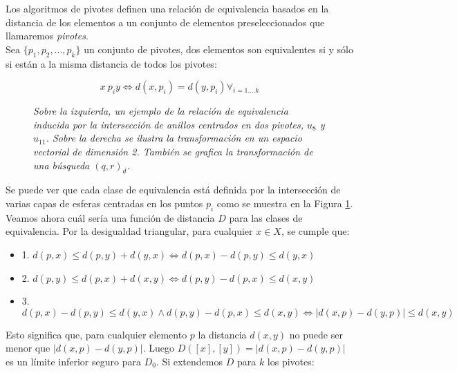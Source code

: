 Los algoritmos de pivotes definen una relaci\'on de equivalencia basados en la distancia de los elementos a un conjunto de elementos preseleccionados que llamaremos \textit{pivotes}.\\

Sea $\{p_1, p_2,...,p_k\}$ un conjunto de pivotes, dos elementos son equivalentes si y s\'olo si est\'an a la misma distancia de todos los pivotes:

\[
x ~ p_i  y \Leftrightarrow d(x,p_i) = d(y,p_i) \forall_{i = 1....k}
\]

\begin{figure}[htb]
\centerline{ %
   \vspace{.2in}
   }
   \caption [Relaci\'on de equivalencia inducida por dos pivotes y su
   correspondiente transformaci\'on en un espacio vectorial]
     {\textsl{\footnotesize{Sobre la izquierda, un ejemplo de la relaci\'on de equivalencia inducida
        por la intersecci\'on de anillos centrados en dos pivotes, $u_8$ y $u_{11}$.
        Sobre la derecha se ilustra la transformaci\'on en un espacio vectorial de dimensi\'on 2.
    	Tambi\'en se grafica la transformaci\'on de una b\'usqueda $(q,r)_d$. }}}
\label{piv1}
\end{figure} 

Se puede ver que cada clase de equivalencia est\'a definida por la intersecci\'on de varias capas de esferas centradas en los puntos $p_i$ como se muestra en la Figura \ref{piv1}.\\

Veamos ahora cu\'al ser\'ia una funci\'on de distancia $D$ para las clases de equivalencia.  Por la desigualdad triangular, para cualquier $x \in X$, se cumple que:

\begin{itemize}
\item 1. $d(p,x) \leq d(p,y) + d(y,x) \Leftrightarrow d(p,x) - d(p,y) \leq d(y,x)$
\item 2. $d(p,y) \leq d(p,x) + d(x,y) \Leftrightarrow d(p,y) - d(p,x) \leq d(x,y)$
\item 3. $d(p,x) - d(p,y) \leq d(y,x) \wedge d(p,y) - d(p,x) \leq d(x,y) \Leftrightarrow |d(x,p) - d(y,p)| \leq d(x,y)$
\end{itemize}

Esto significa que, para cualquier elemento $p$ la distancia $d(x,y)$ no puede ser menor que $|d(x,p) - d(y,p)|$. Luego  $D([x],[y]) = |d(x,p) - d(y,p)|$  es un l\'imite inferior seguro para $D_0$. Si extendemos $D$ para $k$ los pivotes:

